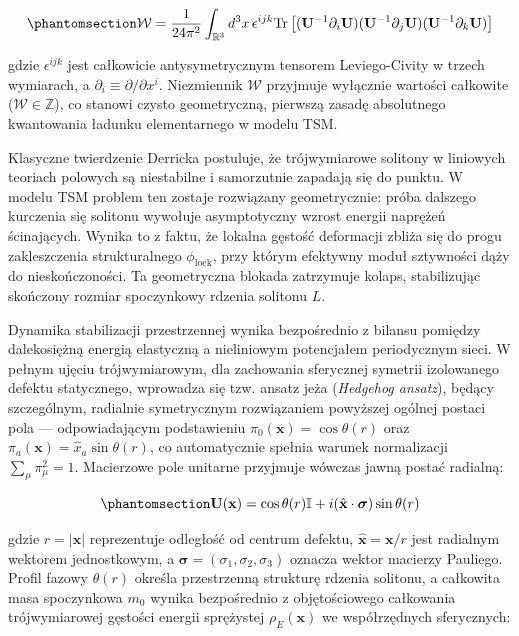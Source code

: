 \documentclass[
  polish,
  letterpaper,
  DIV=11,
  numbers=noendperiod,
  oneside]{scrartcl}
\begin{document}
\begin{equation}\protect\phantomsection\label{eq-1-6-wz2-w}{\mathcal{W} = \frac{1}{24\pi^2} \int_{\mathbb{R}^3} d^3x \, \epsilon^{ijk} \text{Tr}\left[ (\mathbf{U}^{-1}\partial_i \mathbf{U}) (\mathbf{U}^{-1}\partial_j \mathbf{U}) (\mathbf{U}^{-1}\partial_k \mathbf{U}) \right]}\end{equation}

gdzie \(\epsilon^{ijk}\) jest całkowicie antysymetrycznym tensorem
Leviego-Civity w trzech wymiarach, a
\(\partial_i \equiv \partial/\partial x^i\). Niezmiennik \(\mathcal{W}\)
przyjmuje wyłącznie wartości całkowite (\(\mathcal{W} \in \mathbb{Z}\)),
co stanowi czysto geometryczną, pierwszą zasadę absolutnego kwantowania
ładunku elementarnego w modelu TSM.

Klasyczne twierdzenie Derricka postuluje, że trójwymiarowe solitony w
liniowych teoriach polowych są niestabilne i samorzutnie zapadają się do
punktu. W modelu TSM problem ten zostaje rozwiązany geometrycznie: próba
dalszego kurczenia się solitonu wywołuje asymptotyczny wzrost energii
naprężeń ścinających. Wynika to z faktu, że lokalna gęstość deformacji
zbliża się do progu zakleszczenia strukturalnego \(\phi_{\text{lock}}\),
przy którym efektywny moduł sztywności dąży do nieskończoności. Ta
geometryczna blokada zatrzymuje kolaps, stabilizując skończony rozmiar
spoczynkowy rdzenia solitonu \(L\).

Dynamika stabilizacji przestrzennej wynika bezpośrednio z bilansu
pomiędzy dalekosiężną energią elastyczną a nieliniowym potencjałem
periodycznym sieci. W pełnym ujęciu trójwymiarowym, dla zachowania
sferycznej symetrii izolowanego defektu statycznego, wprowadza się tzw.
ansatz jeża (\emph{Hedgehog ansatz}), będący szczególnym, radialnie
symetrycznym rozwiązaniem powyższej ogólnej postaci pola ---
odpowiadającym podstawieniu \(\pi_0(\mathbf{x})=\cos\theta(r)\) oraz
\(\pi_a(\mathbf{x})=\hat{x}_a\sin\theta(r)\), co automatycznie spełnia
warunek normalizacji \(\sum_\mu\pi_\mu^2=1\). Macierzowe pole unitarne
przyjmuje wówczas jawną postać radialną:

\begin{equation}\protect\phantomsection\label{eq-1-6-wz3}{\mathbf{U}(\mathbf{x}) = \cos\theta(r)\mathbb{I} + i (\hat{\mathbf{x}} \cdot \boldsymbol{\sigma}) \sin\theta(r)}\end{equation}

gdzie \(r = |\mathbf{x}|\) reprezentuje odległość od centrum defektu,
\(\hat{\mathbf{x}} = \mathbf{x}/r\) jest radialnym wektorem
jednostkowym, a \(\boldsymbol{\sigma} = (\sigma_1, \sigma_2, \sigma_3)\)
oznacza wektor macierzy Pauliego. Profil fazowy \(\theta(r)\) określa
przestrzenną strukturę rdzenia solitonu, a całkowita masa spoczynkowa
\(m_0\) wynika bezpośrednio z objętościowego całkowania trójwymiarowej
gęstości energii sprężystej \(\rho_{E}(\mathbf{x})\) we współrzędnych
sferycznych:
\end{document}
